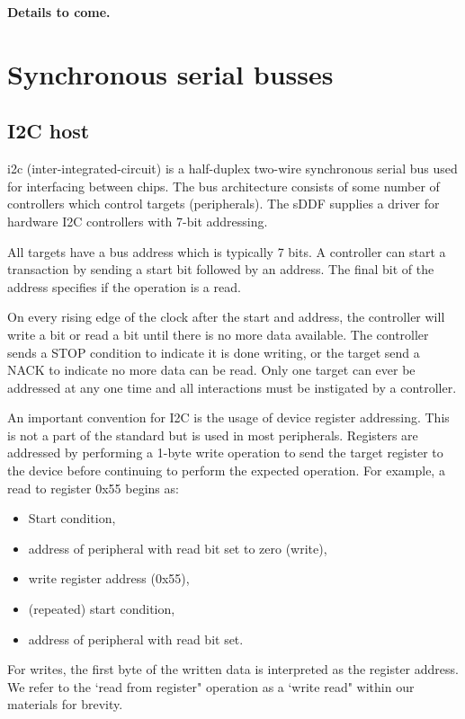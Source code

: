 \documentclass[a4paper,12pt]{report}
\newcommand{\ToCome}[1]{\textbf{#1 to come.}}
\begin{document}
\ToCome{Details}


\section{Synchronous serial busses}\label{s:cl-bus}

\subsection{I2C host}\label{s:cl-i2c}

\gls{i2c} (inter-integrated-circuit) is a half-duplex two-wire
synchronous serial bus used for interfacing between chips. The
bus architecture consists of some number of controllers
which control targets (peripherals). The sDDF supplies a
driver for hardware I2C controllers with 7-bit addressing.

All targets have a bus address which is typically 7 bits.
A controller can start a transaction by sending a start bit
followed by an address. The final bit of the address specifies
if the operation is a read.

On every rising edge of the clock after the start and address,
the controller will write a bit or read a bit until there is
no more data available. The controller sends a STOP condition
to indicate it is done writing, or the target send a NACK to
indicate no more data can be read. Only one target can ever
be addressed at any one time and all interactions must be
instigated by a controller.

An important convention for I2C is the usage of device register
addressing. This is not a part of the standard but is used in
most peripherals. Registers are addressed by performing a 1-byte
write operation to send the target register to the device before
continuing to perform the expected operation. For example, a read
to register 0x55 begins as:
\begin{itemize}
  \item Start condition,
  \item address of peripheral with read bit set to zero (write),
  \item write register address (0x55),
  \item (repeated) start condition,
  \item address of peripheral with read bit set.
\end{itemize}

For writes, the first byte of the written data is interpreted as
the register address. We refer to the `read from register" operation
as a `write read" within our materials for brevity.
\end{document}

